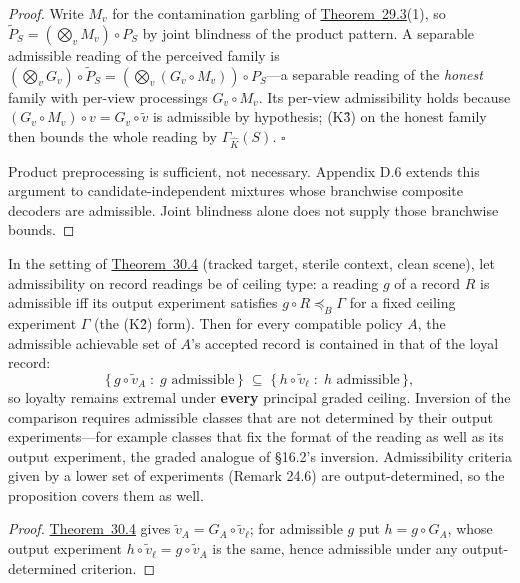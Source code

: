 \begin{proof}

Write \(M_v\) for the contamination garbling of \hyperlink{stmt:29.3}{Theorem~29.3}(1), so \(\widetilde{P}_S = (\bigotimes_v M_v) \circ P_S\) by joint blindness of the product pattern. A separable admissible reading of the perceived family is \((\bigotimes_v G_v) \circ \widetilde{P}_S = (\bigotimes_v (G_v \circ M_v)) \circ P_S\)---\hspace{0pt}a separable reading of the \emph{honest} family with per-view processings \(G_v \circ M_v\). Its per-view admissibility holds because \((G_v \circ M_v) \circ v = G_v \circ \tilde v\) is admissible by hypothesis; (K3̂) on the honest family then bounds the whole reading by \(\Gamma_{\widehat K}(S)\). \(\square\)

Product preprocessing is sufficient, not necessary. Appendix D.6 extends this argument to candidate-independent mixtures whose branchwise composite decoders are admissible. Joint blindness alone does not supply those branchwise bounds.
\end{proof}

\begin{thmplain}

In the setting of \hyperlink{stmt:30.4}{Theorem~30.4} (tracked target, sterile context, clean scene), let admissibility on record readings be of ceiling type: a reading \(g\) of a record \(R\) is admissible iff its output experiment satisfies \(g \circ R \preceq_B \Gamma\) for a fixed ceiling experiment \(\Gamma\) (the (K2̂) form). Then for every compatible policy \(A\), the admissible achievable set of \(A\)'s accepted record is contained in that of the loyal record:
\[
\{\, g \circ \tilde v_A \;:\; g \text{ admissible} \,\} \;\subseteq\; \{\, h \circ \tilde v_\ell \;:\; h \text{ admissible} \,\},
\]
so loyalty remains extremal under \textbf{every} principal graded ceiling. Inversion of the comparison requires admissible classes that are not determined by their output experiments---\hspace{0pt}for example classes that fix the format of the reading as well as its output experiment, the graded analogue of §16.2's inversion. Admissibility criteria given by a lower set of experiments (Remark 24.6) are output-determined, so the proposition covers them as well.
\end{thmplain}

\begin{proof}

\hyperlink{stmt:30.4}{Theorem~30.4} gives \(\tilde v_A = G_A \circ \tilde v_\ell\); for admissible \(g\) put \(h = g \circ G_A\), whose output experiment \(h \circ \tilde v_\ell = g \circ \tilde v_A\) is the same, hence admissible under any output-determined criterion.
\end{proof}

